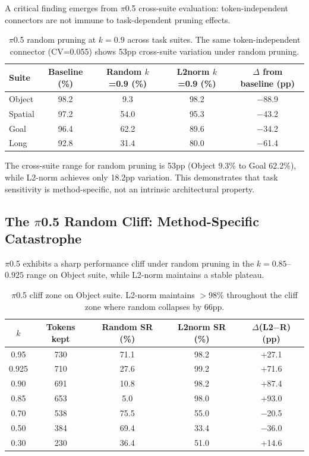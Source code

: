 \documentclass[letterpaper]{article}
\begin{document}
A critical finding emerges from $\pi$0.5 cross-suite evaluation: token-independent connectors are not immune to task-dependent pruning effects.

\begin{table}[h]
\centering
\caption{$\pi$0.5 random pruning at $k=0.9$ across task suites. The same token-independent connector (CV=0.055) shows 53pp cross-suite variation under random pruning.}
\label{tab:pi05_cross_suite}
\begin{tabular}{lcccc}
\toprule
Suite & Baseline (\%) & Random $k$=0.9 (\%) & L2norm $k$=0.9 (\%) & $\Delta$ from baseline (pp) \\
\midrule
Object & 98.2 & 9.3 & 98.2 & $-$88.9 \\
Spatial & 97.2 & 54.0 & 95.3 & $-$43.2 \\
Goal & 96.4 & 62.2 & 89.6 & $-$34.2 \\
Long & 92.8 & 31.4 & 80.0 & $-$61.4 \\
\bottomrule
\end{tabular}
\end{table}

The cross-suite range for random pruning is 53pp (Object 9.3\% to Goal 62.2\%), while L2-norm achieves only 18.2pp variation.
This demonstrates that task sensitivity is method-specific, not an intrinsic architectural property.

\subsection{The $\pi$0.5 Random Cliff: Method-Specific Catastrophe}

$\pi$0.5 exhibits a sharp performance cliff under random pruning in the $k=0.85$--$0.925$ range on Object suite, while L2-norm maintains a stable plateau.

\begin{table}[h]
\centering
\caption{$\pi$0.5 cliff zone on Object suite. L2-norm maintains $>$98\% throughout the cliff zone where random collapses by 66pp.}
\label{tab:pi05_cliff}
\begin{tabular}{ccccc}
\toprule
$k$ & Tokens kept & Random SR (\%) & L2norm SR (\%) & $\Delta$(L2$-$R) (pp) \\
\midrule
0.95 & 730 & 71.1 & 98.2 & +27.1 \\
0.925 & 710 & 27.6 & 99.2 & +71.6 \\
0.90 & 691 & 10.8 & 98.2 & +87.4 \\
0.85 & 653 & 5.0 & 98.0 & +93.0 \\
0.70 & 538 & 75.5 & 55.0 & $-$20.5 \\
0.50 & 384 & 69.4 & 33.4 & $-$36.0 \\
0.30 & 230 & 36.4 & 51.0 & +14.6 \\
\bottomrule
\end{tabular}
\end{table}
\end{document}
